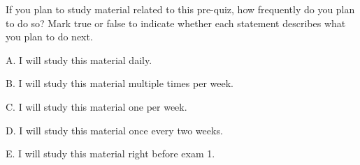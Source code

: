 \documentclass{ximera}
\begin{document}
\begin{question}

If you plan to study material related to this pre-quiz, how frequently do you plan to do so?  Mark true or false to indicate whether each statement describes what you plan to do next.

\vspace{1 in}

\begin{question}

    A. I will study this material daily. 

    \begin{multipleChoice}
    \end{multipleChoice}
    
\end{question}
\begin{question}
    
    B. I will study this material multiple times per week.
    
    \begin{multipleChoice}
    \end{multipleChoice}
    
\end{question}
\begin{question}
    
    C. I will study this material one per week. 

    \begin{multipleChoice}
    \end{multipleChoice}
    
\end{question}
\begin{question}
    
    D. I will study this material once every two weeks. 

    \begin{multipleChoice}
    \end{multipleChoice}
    
\end{question}
\begin{question}
    
    E. I will study this material right before exam 1. 

    \begin{multipleChoice}
    \end{multipleChoice}
    

\end{question}
\end{question}
\end{document}
